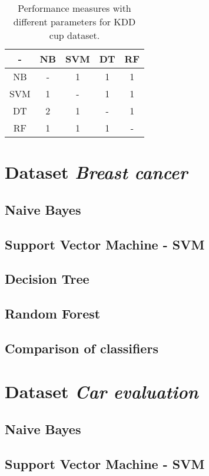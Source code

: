 \documentclass[11pt,a4paper,titlepage]{article}
\begin{document}
  \begin{table}
  \centering
  \begin{tabular}{| c | c | c | c | c |}
    \hline
     		-	   & NB 	  & 	SVM 	& DT		 & RF \\ \hline
    NB 			   &  - 	  &     1		& 		1	 & 	1 		\\ \hline
    SVM 		   & 	1	  & 	- 		& 		1	 &	1 		\\ \hline
    DT 			   & 	2	  & 	1		& 		-	 &	1		\\ \hline
    RF 			   &  1       & 	1		& 		1	 &	-			\\
    \hline
  \end{tabular}
  \caption{Performance measures with different parameters for KDD cup dataset.}
  \label{table:comparisonKDD}
  \end{table}




\section{Dataset \textit{Breast cancer}}

\subsection{Naive Bayes}
\subsection{Support Vector Machine - SVM}
\subsection{Decision Tree}
\subsection{Random Forest}
\subsection{Comparison of classifiers}

\section{Dataset \textit{Car evaluation}}

\subsection{Naive Bayes}
\subsection{Support Vector Machine - SVM}
\end{document}
